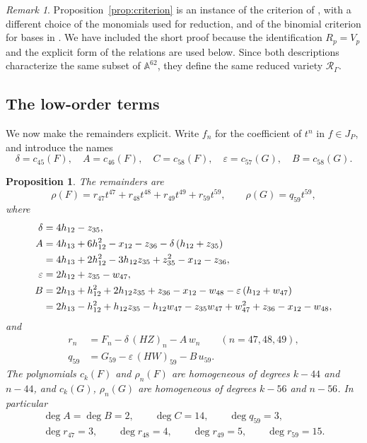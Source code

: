 \documentclass{amsart}
\newtheorem{proposition}[theorem]{Proposition}
\theoremstyle{definition}
\theoremstyle{remark}
\newtheorem{remark}[theorem]{Remark}
\numberwithin{equation}{section}
\newcommand{\AF}{\mathbb{A}}
\newcommand{\Rs}{\mathcal{R}_\Gamma}
\begin{document}
\begin{remark}
Proposition~\ref{prop:criterion} is an instance of the criterion of \cite[Proposition~2.17 and Theorem~2.22]{Ham20}, with a different choice of the monomials used for reduction, and of the binomial criterion for bases in \cite[Theorem~2.9]{AGM17}. We have included the short proof because the identification $R_p=V_p$ and the explicit form of the relations are used below. Since both descriptions characterize the same subset of $\AF^{62}$, they define the same reduced variety $\Rs$.
\end{remark}

\subsection{The low-order terms}
We now make the remainders explicit. Write $f_n$ for the coefficient of $t^n$ in $f\in J_P$, and introduce the names
\[
\delta=c_{45}(F),\quad A=c_{46}(F),\quad C=c_{58}(F),\quad \varepsilon=c_{57}(G),\quad B=c_{58}(G).
\]

\begin{proposition}\label{prop:lowterms}
The remainders are
\[
\rho(F)=r_{47}t^{47}+r_{48}t^{48}+r_{49}t^{49}+r_{59}t^{59},\qquad \rho(G)=q_{59}t^{59},
\]
where
\begin{align}
\delta&=4h_{12}-z_{35},\label{eq:delta}\\
A&=4h_{13}+6h_{12}^2-x_{12}-z_{36}-\delta\,(h_{12}+z_{35})\notag\\
&=4h_{13}+2h_{12}^2-3h_{12}z_{35}+z_{35}^2-x_{12}-z_{36},\label{eq:A}\\
\varepsilon&=2h_{12}+z_{35}-w_{47},\label{eq:eps}\\
B&=2h_{13}+h_{12}^2+2h_{12}z_{35}+z_{36}-x_{12}-w_{48}-\varepsilon\,(h_{12}+w_{47})\notag\\
&=2h_{13}-h_{12}^2+h_{12}z_{35}-h_{12}w_{47}-z_{35}w_{47}+w_{47}^2+z_{36}-x_{12}-w_{48},\label{eq:B}
\end{align}
and
\begin{align}
r_n&=F_n-\delta\,(HZ)_n-A\,w_n\qquad(n=47,48,49),\label{eq:rn}\\
q_{59}&=G_{59}-\varepsilon\,(HW)_{59}-B\,u_{59}.\label{eq:q59}
\end{align}
The polynomials $c_k(F)$ and $\rho_n(F)$ are homogeneous of degrees $k-44$ and $n-44$, and $c_k(G)$, $\rho_n(G)$ are homogeneous of degrees $k-56$ and $n-56$. In particular
\begin{gather*}
\deg A=\deg B=2,\qquad \deg C=14,\qquad \deg q_{59}=3,\\
\deg r_{47}=3,\qquad \deg r_{48}=4,\qquad \deg r_{49}=5,\qquad \deg r_{59}=15.
\end{gather*}
\end{proposition}
\end{document}
